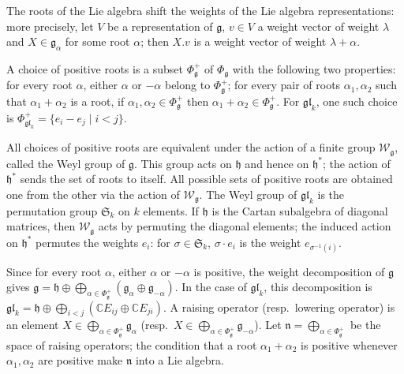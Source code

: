 \documentclass[10pt,a4paper]{article}
\begin{document}
The roots of the Lie algebra shift the weights of the Lie algebra representations: more precisely, let $V$ be a representation of $\mathfrak{g}$, $v\in V$ a weight vector of weight $\lambda$ and $X\in\mathfrak{g}_{\alpha}$ for some root $\alpha$; then $X.v$ is a weight vector of weight $\lambda+\alpha$.





A choice of positive roots is a subset $\Phi_{\mathfrak{g}}^{+}$ of $\Phi_{\mathfrak{g}}$ with the following two properties: for every root $\alpha$, either $\alpha$ or $-\alpha$ belong to $\Phi_{\mathfrak{g}}^{+}$; for every pair of roots $\alpha_{1},\alpha_{2}$ such that $\alpha_{1}+\alpha_{2}$ is a root, if $\alpha_{1},\alpha_{2}\in\Phi_{\mathfrak{g}}^{+}$ then $\alpha_{1}+\alpha_{2}\in\Phi_{\mathfrak{g}}^{+}$. For $\mathfrak{gl}_{k}$, one such choice is $\Phi_{\mathfrak{gl}_{k}}^{+}=\{e_{i}-e_{j}\mid i<j\}$.





All choices of positive roots are equivalent under the action of a finite group $\mathcal{W}_{\mathfrak{g}}$, called the Weyl group of $\mathfrak{g}$. This group acts on $\mathfrak{h}$ and hence on $\mathfrak{h}^{*}$; the action of $\mathfrak{h}^{*}$ sends the set of roots to itself. All possible sets of positive roots are obtained one from the other via the action of $\mathcal{W}_{\mathfrak{g}}$. The Weyl group of $\mathfrak{gl}_{k}$ is the permutation group $\mathfrak{S}_{k}$ on $k$ elements. If $\mathfrak{h}$ is the Cartan subalgebra of diagonal matrices, then $\mathcal{W}_{\mathfrak{g}}$ acts by permuting the diagonal elements; the induced action on $\mathfrak{h}^{*}$ permutes the weights $e_{i}$: for $\sigma\in\mathfrak{S}_{k}$, $\sigma\cdot e_{i}$ is the weight $e_{\sigma^{-1}(i)}$.





Since for every root $\alpha$, either $\alpha$ or $-\alpha$ is positive, the weight decomposition of $\mathfrak{g}$ gives $\mathfrak{g}=\mathfrak{h}\oplus\bigoplus_{\alpha\in\Phi_{\mathfrak{g}}^{+}}(\mathfrak{g}_{\alpha}\oplus\mathfrak{g}_{-\alpha})$. In the case of $\mathfrak{gl}_{k}$, this decomposition is $\mathfrak{gl}_{k}=\mathfrak{h}\oplus\bigoplus_{i<j}(\mathbb{C}E_{ij}\oplus\mathbb{C}E_{ji})$. A raising operator (resp. lowering operator) is an element $X\in\bigoplus_{\alpha\in\Phi_{\mathfrak{g}}^{+}}\mathfrak{g}_{\alpha}$ (resp. $X\in\bigoplus_{\alpha\in\Phi_{\mathfrak{g}}^{+}}\mathfrak{g}_{-\alpha}$). Let $\mathfrak{n}=\bigoplus_{\alpha\in\Phi_{\mathfrak{g}}^{+}}$ be the space of raising operators; the condition that a root $\alpha_{1}+\alpha_{2}$ is positive whenever $\alpha_{1},\alpha_{2}$ are positive make $\mathfrak{n}$ into a Lie algebra.
\end{document}
